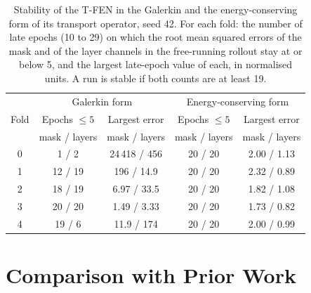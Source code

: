 \begin{table}[t]
  \centering
  \caption[Stability of the T-FEN in both operator forms.]{%
    Stability of the T-FEN in the Galerkin and the energy-conserving form
    of its transport operator, seed 42. For each fold: the number of late
    epochs (10 to 29) on which the root mean squared errors of the mask and
    of the layer channels in the free-running rollout stay at or below 5,
    and the largest late-epoch value of each, in normalised units. A run is stable if both counts are at least 19.}
  \label{tab:experiments:tfen-stability}
  \small
  \begin{tabular}{c c c c c}
    \toprule
     & \multicolumn{2}{c}{Galerkin form} &
       \multicolumn{2}{c}{Energy-conserving form} \\
    Fold & Epochs $\le 5$ & Largest error & Epochs $\le 5$ & Largest error \\
     & mask / layers & mask / layers & mask / layers & mask / layers \\
    \midrule
    0 & 1 / 2 & 24\,418 / 456 & 20 / 20 & 2.00 / 1.13 \\
    1 & 12 / 19 & 196 / 14.9 & 20 / 20 & 2.32 / 0.89 \\
    2 & 18 / 19 & 6.97 / 33.5 & 20 / 20 & 1.82 / 1.08 \\
    3 & 20 / 20 & 1.49 / 3.33 & 20 / 20 & 1.73 / 0.82 \\
    4 & 19 / 6 & 11.9 / 174 & 20 / 20 & 2.00 / 0.99 \\
    \bottomrule
  \end{tabular}
\end{table}


\section{Comparison with Prior Work}
\label{sec:experiments:qualitative}
\label{sec:experiments:qualitative:mai}

